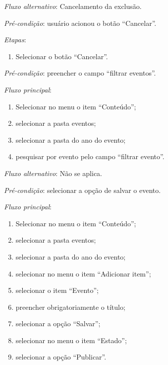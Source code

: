 \noindent \textit{Fluxo alternativo}: Cancelamento da exclusão.

\noindent \textit{Pré-condição}: usuário acionou o botão ``Cancelar''.

\noindent \textit{Etapas}:

\begin{enumerate}
    \item Selecionar o botão ``Cancelar''.
\end{enumerate}




\vspace{0.7cm}

\noindent \textit{Pré-condição}: preencher o campo ``filtrar eventos''.

\noindent \textit{Fluxo principal}:

\begin{enumerate}
    \item Selecionar no menu o item ``Conteúdo'';
    \item selecionar a pasta eventos;
    \item selecionar a pasta do ano do evento;
    \item pesquisar por evento pelo campo ``filtrar evento''.
\end{enumerate}

\noindent \textit{Fluxo alternativo}: Não se aplica.



\vspace{0.7cm}

\noindent \textit{Pré-condição}: selecionar a opção de salvar o evento.

\noindent \textit{Fluxo principal}:

\begin{enumerate}
    \item Selecionar no menu o item ``Conteúdo'';
    \item selecionar a pasta eventos;
    \item selecionar a pasta do ano do evento;
    \item selecionar no menu o item ``Adicionar item'';
    \item selecionar o item ``Evento'';
    \item preencher obrigatoriamente o título;
    \item selecionar a opção ``Salvar'';
    \item selecionar no menu o item ``Estado'';
    \item selecionar a opção ``Publicar''.
\end{enumerate}

